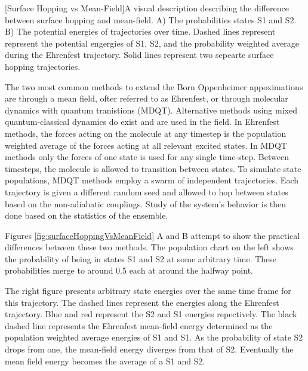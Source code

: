 \noindent
       \begin{multiFigure} 
	 [Surface Hopping vs Mean-Field]{A visual description describing the difference between surface hopping and mean-field. A) The probabilities states S1 and S2. B) The potential energies of trajectories over time. Dashed lines represent represent the potential engergies of S1, S2, and the probability weighted average during the Ehrenfest trajectory. Solid lines represent two sepearte surface hopping trajectories.}
	 \label{fig:surfaceHoppingVsMeanField}
       \end{multiFigure}
\bigskip

The two most common methods to extend the Born Oppenheimer appoximations are through a mean field, ofter referred to as Ehrenfest, or through molecular dynamics with quantum tranistions (MDQT).\cite{Hammes-Schiffer1994}
Alternative methods using mixed quantum-classical dynamics do exist and are used in the field. \cite{habershon2013ring,kapral2006progress}
In Ehrenfest methods, the forces acting on the molecule at any timestep is the population weighted average of the forces acting at all relevant excited states.
In MDQT methods only the forces of one state is used for any single time-step. \cite{prezhdo1997evaluation}
Between timesteps, the molecule is allowed to transition between states.
To simulate state populations, MDQT methods employ a swarm of independent trajectories.
Each trajectory is given a different random seed and allowed to hop between states based on the non-adiabatic couplings.
Study of the system's behavior is then done based on the statistics of the ensemble.

Figures \ref{fig:surfaceHoppingVsMeanField} A and B attempt to show the practical differences between these two methods.
The population chart on the left shows the probability of being in states S1 and S2 at some arbitrary time.
These probabilities merge to around 0.5 each at around the halfway point.

The right figure presents arbitrary state energies over the same time frame for this trajectory.
The dashed lines represent the energies along the Ehrenfest trajectory.
Blue and red represent the S2 and S1 energies repectively.
The black dashed line represents the Ehrenfest mean-field energy determined as the population weighted average energies of S1 and S1.
As the probability of state S2 drops from one, the mean-field energy diverges from that of S2.
Eventually the mean field energy becomes the average of a S1 and S2.

